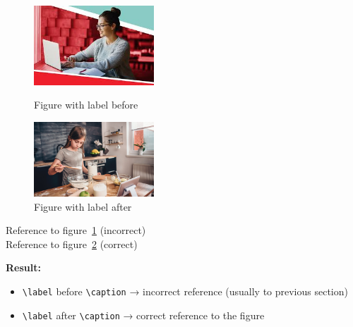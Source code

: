 \documentclass{article}
\begin{document}
\begin{figure}[ht]
    \centering
    \includegraphics[width=0.4\textwidth]{example-image-a}
    \label{fig:before}  %
    \caption{Figure with label before}
\end{figure}

\begin{figure}[ht]
    \centering
    \includegraphics[width=0.4\textwidth]{example-image-b}
    \caption{Figure with label after}
    \label{fig:after}  %
\end{figure}

Reference to figure~\ref{fig:before} (incorrect)\\
Reference to figure~\ref{fig:after} (correct)

\textbf{Result:}
\begin{itemize}
\item \texttt{\textbackslash label} before \texttt{\textbackslash caption} → incorrect reference (usually to previous section)
\item \texttt{\textbackslash label} after \texttt{\textbackslash caption} → correct reference to the figure
\end{itemize}
\end{document}
